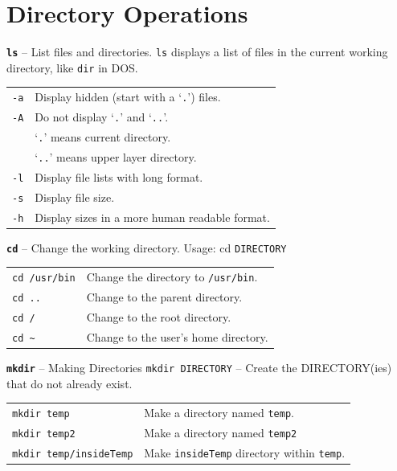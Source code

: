 \documentclass[14pt,aspectratio=1610]{beamer}
\begin{document}
\section{Directory Operations}
\begin{frame} {\texttt{\textbf{ls}} -- List files and directories.}
\lstinline{ls} displays a list of files in the current working directory, like
\lstinline{dir} in DOS.
\vspace{1em}

\begin{tabular}{l l}
  \lstinline{-a} & Display hidden (start with a `\lstinline{.}') files.\\
  \lstinline{-A} & Do not display `\lstinline{.}' and `\lstinline{..}'.\\
     & `\lstinline{.}'  means current directory.\\
     & `\lstinline{..}' means upper layer directory.\\
  \lstinline{-l} & Display file lists with long format.\\
  \lstinline{-s} & Display file size.\\
  \lstinline{-h} & Display sizes in a more human readable format.\\
\end{tabular}
\end{frame}

\begin{frame}{\texttt{\textbf{cd}} -- Change the working directory.}
Usage: cd \lstinline{DIRECTORY}\\\vspace{1em}

\begin{tabular}{l l}
  \lstinline{cd /usr/bin} & Change the directory to \lstinline{/usr/bin}.\\
  \lstinline{cd ..}       & Change to the parent directory. \\
  \lstinline{cd /}        & Change to the root directory. \\
  \lstinline{cd ~}        & Change to the user's home directory.\\
\end{tabular}
\end{frame}


\begin{frame}{\texttt{\textbf{mkdir}} -- Making Directories}
  \lstinline{mkdir DIRECTORY} -- Create the DIRECTORY(ies) that do not already exist.
  \begin{tabularx}{1\textwidth}{l X}
    \lstinline{mkdir temp}            & Make a directory named \lstinline{temp}.\\
    \lstinline{mkdir temp2}           & Make a directory named \lstinline{temp2}\\
    \lstinline{mkdir temp/insideTemp} & Make \lstinline{insideTemp} directory within \lstinline{temp}. \\
  \end{tabularx}\\\vspace{1em}
\end{frame}
\end{document}

